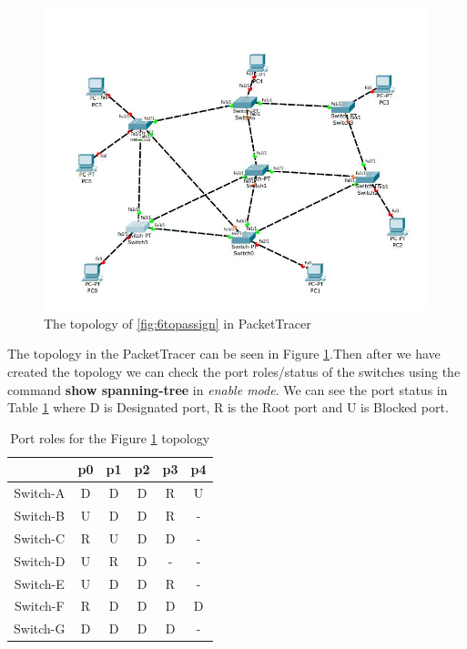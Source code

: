 \documentclass{article}
\begin{document}
\begin{figure}[h]
    \centering
    \includegraphics[scale=0.2]{6top}
    \caption{The topology of \ref{fig:6topassign} in PacketTracer}
    \label{fig:6top}
\end{figure}

The topology in the PacketTracer can be seen in Figure \ref{fig:6top}.Then after we have created the topology we can check the port roles/status of the switches using the command \textbf{show spanning-tree} in \textit{enable mode}. We can see the port status in Table \ref{tab:6portstatus} where D is Designated port, R is the Root port and U is Blocked port. 

\begin{table}[h]
 \centering
    \begin{tabular}{|c|c|c|c|c|c|}
    \hline
         & p0 & p1 & p2 & p3 & p4 \\
    \hline
    Switch-A & D & D & D & R & U \\
    Switch-B & U & D & D & R & - \\
    Switch-C & R & U & D & D & - \\
    Switch-D & U & R & D & - & - \\
    Switch-E & U & D & D & R & - \\
    Switch-F & R & D & D & D & D \\
    Switch-G & D & D & D & D & - \\
    \hline
    \end{tabular}
    \caption{Port roles for the Figure \ref{fig:6top} topology}
    \label{tab:6portstatus}
\end{table}
\end{document}
